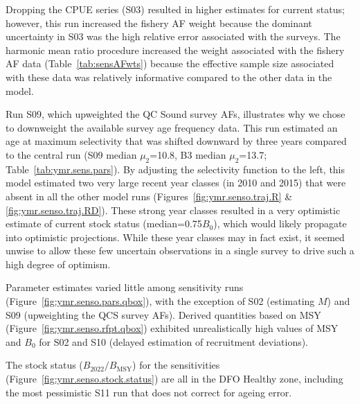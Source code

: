 \documentclass[11pt]{book}
\newcommand{\Bmsy}{B_\text{MSY}}
\begin{document}
Dropping the CPUE series (S03) resulted in higher estimates for current status; however, this run increased the fishery AF weight because the dominant uncertainty in S03 was the high relative error associated with the surveys.
The harmonic mean ratio procedure increased the weight associated with the fishery AF data (Table~\ref{tab:sensAFwts}) because the effective sample size associated with these data was relatively informative compared to the other data in the model.

Run S09, which upweighted the QC Sound survey AFs, illustrates why we chose to downweight the available survey age frequency data.
This run estimated an age at maximum selectivity that was shifted downward by three years compared to the central run (S09 median $\mu_2$=10.8, B3 median $\mu_2$=13.7; Table~\ref{tab:ymr.sens.pars}).
By adjusting the selectivity function to the left, this model estimated two very large recent year classes (in 2010 and 2015) that were absent in all the other model runs (Figures~\ref{fig:ymr.senso.traj.R} \& \ref{fig:ymr.senso.traj.RD}).
These strong year classes resulted in a very optimistic estimate of current stock status (median=0.75$B_0$), which would likely propagate into optimistic projections.
While these year classes may in fact exist, it seemed unwise to allow these few uncertain observations in a single survey to drive such a high degree of optimism.

Parameter estimates varied little among sensitivity runs (Figure~\ref{fig:ymr.senso.pars.qbox}), with the exception of S02 (estimating $M$) and S09 (upweighting the QCS survey AFs).
Derived quantities based on MSY (Figure~\ref{fig:ymr.senso.rfpt.qbox}) exhibited unrealistically high values of MSY and $B_0$ for S02 and S10 (delayed estimation of recruitment deviations).

The stock status ($B_{2022}/\Bmsy$) for the sensitivities (Figure~\ref{fig:ymr.senso.stock.status}) are all in the DFO Healthy zone, including the most pessimistic S11 run that does not correct for ageing error.

\begin{landscapepage}{

}{\LH}{\RH}{\LF}{\RF}\end{landscapepage}

\begin{landscapepage}{

}{\LH}{\RH}{\LF}{\RF} \end{landscapepage}

\begin{landscapepage}{

}{\LH}{\RH}{\LF}{\RF} \end{landscapepage}
\end{document}
